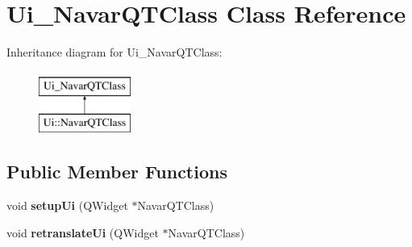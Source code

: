 \hypertarget{class_ui___navar_q_t_class}{}\section{Ui\+\_\+\+Navar\+Q\+T\+Class Class Reference}
\label{class_ui___navar_q_t_class}
Inheritance diagram for Ui\+\_\+\+Navar\+Q\+T\+Class\+:\begin{figure}[H]
\begin{center}
\leavevmode
\includegraphics[height=2.000000cm]{class_ui___navar_q_t_class}
\end{center}
\end{figure}
\subsection*{Public Member Functions}
\begin{DoxyCompactItemize}
\item 
void {\bfseries setup\+Ui} (Q\+Widget $\ast$Navar\+Q\+T\+Class)\hypertarget{class_ui___navar_q_t_class_af668d39ae0db534cc6f2e421fe2b4d8c}{}\label{class_ui___navar_q_t_class_af668d39ae0db534cc6f2e421fe2b4d8c}

\item 
void {\bfseries retranslate\+Ui} (Q\+Widget $\ast$Navar\+Q\+T\+Class)\hypertarget{class_ui___navar_q_t_class_a610b6553965ebad6e4accddcebe39a7f}{}\label{class_ui___navar_q_t_class_a610b6553965ebad6e4accddcebe39a7f}

\end{DoxyCompactItemize}
